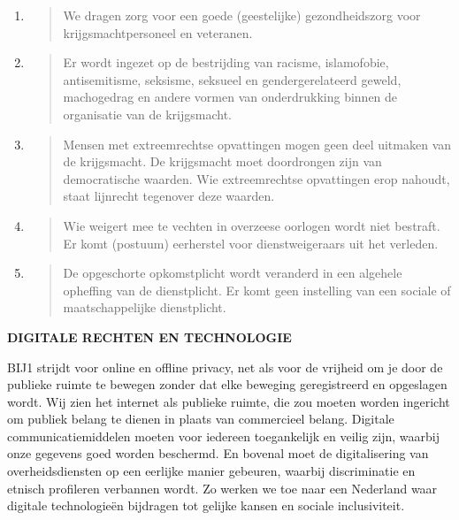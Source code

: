 \begin{enumerate}
\def\labelenumi{\arabic{enumi}.}
\item
  \begin{quote}
  We dragen zorg voor een goede (geestelijke) gezondheidszorg voor
  krijgsmachtpersoneel en veteranen.
  \end{quote}
\item
  \begin{quote}
  Er wordt ingezet op de bestrijding van racisme, islamofobie,
  antisemitisme, seksisme, seksueel en gendergerelateerd geweld,
  machogedrag en andere vormen van onderdrukking binnen de organisatie
  van de krijgsmacht.
  \end{quote}
\item
  \begin{quote}
  Mensen met extreemrechtse opvattingen mogen geen deel uitmaken van de
  krijgsmacht. De krijgsmacht moet doordrongen zijn van democratische
  waarden. Wie extreemrechtse opvattingen erop nahoudt, staat lijnrecht
  tegenover deze waarden.
  \end{quote}
\item
  \begin{quote}
  Wie weigert mee te vechten in overzeese oorlogen wordt niet bestraft.
  Er komt (postuum) eerherstel voor dienstweigeraars uit het verleden.
  \end{quote}
\item
  \begin{quote}
  De opgeschorte opkomstplicht wordt veranderd in een algehele opheffing
  van de dienstplicht. Er komt geen instelling van een sociale of
  maatschappelijke dienstplicht.
  \end{quote}
\end{enumerate}

\textbf{DIGITALE RECHTEN EN TECHNOLOGIE}

BIJ1 strijdt voor online en offline privacy, net als voor de vrijheid om
je door de publieke ruimte te bewegen zonder dat elke beweging
geregistreerd en opgeslagen wordt. Wij zien het internet als publieke
ruimte, die zou moeten worden ingericht om publiek belang te dienen in
plaats van commercieel belang. Digitale communicatiemiddelen moeten voor
iedereen toegankelijk en veilig zijn, waarbij onze gegevens goed worden
beschermd. En bovenal moet de digitalisering van overheidsdiensten op
een eerlijke manier gebeuren, waarbij discriminatie en etnisch
profileren verbannen wordt. Zo werken we toe naar een Nederland waar
digitale technologieën bijdragen tot gelijke kansen en sociale
inclusiviteit.

